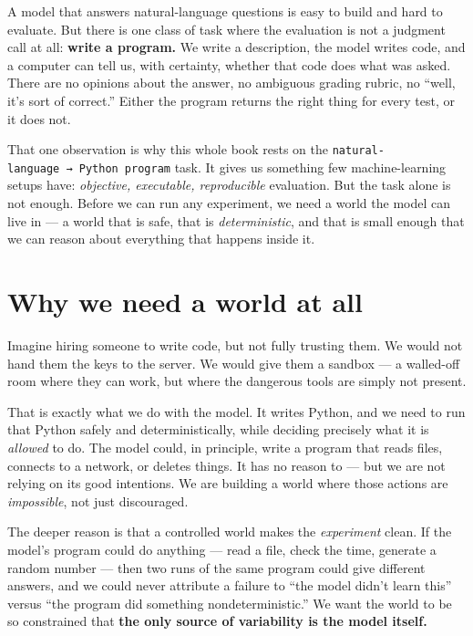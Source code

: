 A model that answers natural-language questions is easy to build and
hard to evaluate. But there is one class of task where the evaluation is
not a judgment call at all: \textbf{write a program.} We write a
description, the model writes code, and a computer can tell us, with
certainty, whether that code does what was asked. There are no opinions
about the answer, no ambiguous grading rubric, no ``well, it's sort of
correct.'' Either the program returns the right thing for every test, or
it does not.

That one observation is why this whole book rests on the
\texttt{natural-language\ →\ Python\ program} task. It gives us
something few machine-learning setups have: \emph{objective, executable,
reproducible} evaluation. But the task alone is not enough. Before we
can run any experiment, we need a world the model can live in --- a
world that is safe, that is \emph{deterministic}, and that is small
enough that we can reason about everything that happens inside it.

\section{Why we need a world at all}\label{why-we-need-a-world-at-all}

Imagine hiring someone to write code, but not fully trusting them. We
would not hand them the keys to the server. We would give them a sandbox
--- a walled-off room where they can work, but where the dangerous tools
are simply not present.

That is exactly what we do with the model. It writes Python, and we need
to run that Python safely and deterministically, while deciding
precisely what it is \emph{allowed} to do. The model could, in
principle, write a program that reads files, connects to a network, or
deletes things. It has no reason to --- but we are not relying on its
good intentions. We are building a world where those actions are
\emph{impossible}, not just discouraged.

The deeper reason is that a controlled world makes the \emph{experiment}
clean. If the model's program could do anything --- read a file, check
the time, generate a random number --- then two runs of the same program
could give different answers, and we could never attribute a failure to
``the model didn't learn this'' versus ``the program did something
nondeterministic.'' We want the world to be so constrained that
\textbf{the only source of variability is the model itself.}

